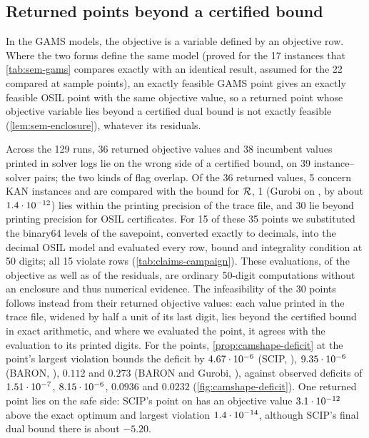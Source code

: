 



\subsection{Returned points beyond a certified bound}\label{app:solvers-points}

In the GAMS models, the objective is a variable defined by an objective row.
Where the two forms define the same model (proved for the 17 instances that \cref{tab:sem-gams} compares exactly with an identical result, assumed for the 22 compared at sample points), an exactly feasible GAMS point gives an exactly feasible OSIL point with the same objective value, so a returned point whose objective variable lies beyond a certified dual bound is not exactly feasible (\cref{lem:sem-enclosure}), whatever its residuals.

Across the 129 runs, 36 returned objective values and 38 incumbent values printed in solver logs lie on the wrong side of a certified bound, on 39 instance--solver pairs; the two kinds of flag overlap.
Of the 36 returned values, 5 concern KAN instances and are compared with the bound for $\mathcal{R}$, 1 (Gurobi on , by about $1.4\cdot 10^{-12}$) lies within the printing precision of the trace file, and 30 lie beyond printing precision for OSIL certificates.
For 15 of these 35 points we substituted the binary64 levels of the savepoint, converted exactly to decimals, into the decimal OSIL model and evaluated every row, bound and integrality condition at 50 digits; all 15 violate rows (\cref{tab:claims-campaign}).
These evaluations, of the objective as well as of the residuals, are ordinary 50-digit computations without an enclosure and thus numerical evidence.
The infeasibility of the 30 points follows instead from their returned objective values: each value printed in the trace file, widened by half a unit of its last digit, lies beyond the certified bound in exact arithmetic, and where we evaluated the point, it agrees with the evaluation to its printed digits.
For the  points, \cref{prop:camshape-deficit} at the point's largest violation bounds the deficit by $4.67\cdot 10^{-6}$ (SCIP, ), $9.35\cdot 10^{-6}$ (BARON, ), $0.112$ and $0.273$ (BARON and Gurobi, ), against observed deficits of $1.51\cdot 10^{-7}$, $8.15\cdot 10^{-6}$, $0.0936$ and $0.0232$ (\cref{fig:camshape-deficit}).
One returned point lies on the safe side: SCIP's point on  has an objective value $3.1\cdot 10^{-12}$ above the exact optimum and largest violation $1.4\cdot 10^{-14}$, although SCIP's final dual bound there is about $-5.20$.

